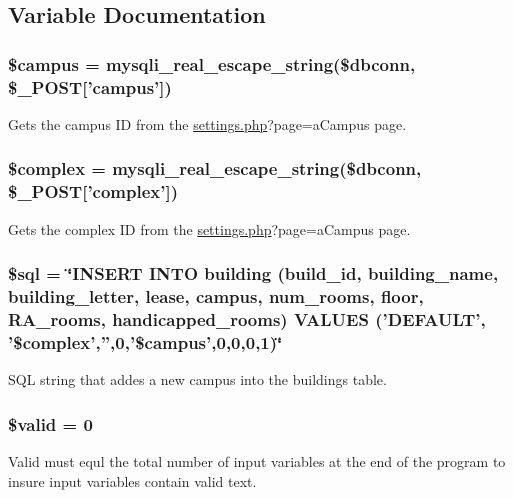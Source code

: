 \subsection{\-Variable \-Documentation}
\hypertarget{campusVal_8php_a6f0655994f3941d6ab50f681032f899b}{
\subsubsection[{\$campus}]{\setlength{\rightskip}{0pt plus 5cm}\$campus = mysqli\-\_\-real\-\_\-escape\-\_\-string(\$dbconn, \$\-\_\-\-P\-O\-S\-T\mbox{[}'campus'\mbox{]})}}\label{campusVal_8php_a6f0655994f3941d6ab50f681032f899b}
\-Gets the campus \-I\-D from the \hyperlink{settings_8php}{settings.\-php}?page=a\-Campus page. \hypertarget{campusVal_8php_a25ec02534214977602829622b78b5d78}{
\subsubsection[{\$complex}]{\setlength{\rightskip}{0pt plus 5cm}\$complex = mysqli\-\_\-real\-\_\-escape\-\_\-string(\$dbconn, \$\-\_\-\-P\-O\-S\-T\mbox{[}'complex'\mbox{]})}}\label{campusVal_8php_a25ec02534214977602829622b78b5d78}
\-Gets the complex \-I\-D from the \hyperlink{settings_8php}{settings.\-php}?page=a\-Campus page. \hypertarget{campusVal_8php_a047170d6020a882807665812a27e2525}{
\subsubsection[{\$sql}]{\setlength{\rightskip}{0pt plus 5cm}\$sql = \char`\"{}\-I\-N\-S\-E\-R\-T \-I\-N\-T\-O building (build\-\_\-id, building\-\_\-name, building\-\_\-letter, lease, campus, num\-\_\-rooms, floor, \-R\-A\-\_\-rooms, handicapped\-\_\-rooms) \-V\-A\-L\-U\-E\-S ('\-D\-E\-F\-A\-U\-L\-T', '\$complex','',0,'\$campus',0,0,0,1)\char`\"{}}}\label{campusVal_8php_a047170d6020a882807665812a27e2525}
\-S\-Q\-L string that addes a new campus into the buildings table. \hypertarget{campusVal_8php_a0587674d27d00ef497e08e53ccf45bbb}{
\subsubsection[{\$valid}]{\setlength{\rightskip}{0pt plus 5cm}\$valid = 0}}\label{campusVal_8php_a0587674d27d00ef497e08e53ccf45bbb}
\-Valid must equl the total number of input variables at the end of the program to insure input variables contain valid text. 